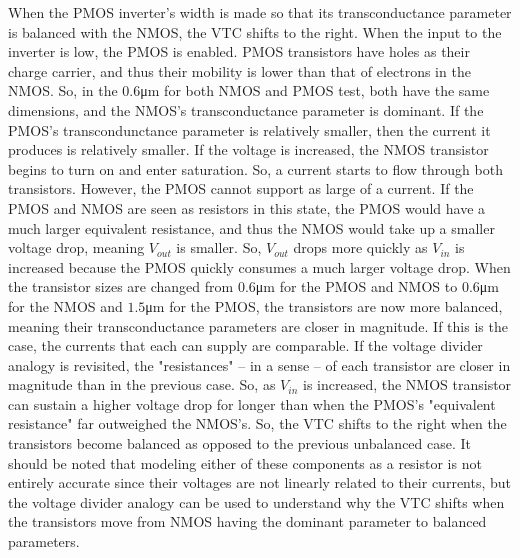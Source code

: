When the PMOS inverter's width is made so that its transconductance parameter is balanced with the NMOS, the VTC shifts to the right. When the input to the inverter is low, the PMOS is enabled. PMOS transistors have holes as their charge carrier, and thus their mobility is lower than that of electrons in the NMOS. So, in the $0.6$\si{\micro\meter} for both NMOS and PMOS test, both have the same dimensions, and the NMOS's transconductance parameter is dominant. If the PMOS's transcondunctance parameter is relatively smaller, then the current it produces is relatively smaller. If the voltage is increased, the NMOS transistor begins to turn on and enter saturation. So, a current starts to flow through both transistors. However, the PMOS cannot support as large of a current. If the PMOS and NMOS are seen as resistors in this state, the PMOS would have a much larger equivalent resistance, and thus the NMOS would take up a smaller voltage drop, meaning $V_{out}$ is smaller. So, $V_{out}$ drops more quickly as $V_{in}$ is increased because the PMOS quickly consumes a much larger voltage drop.
When the transistor sizes are changed from $0.6$\si{\micro\meter} for the PMOS and NMOS to $0.6$\si{\micro\meter} for the NMOS and $1.5$\si{\micro\meter} for the PMOS, the transistors are now more balanced, meaning their transconductance parameters are closer in magnitude. If this is the case, the currents that each can supply are comparable. If the voltage divider analogy is revisited, the "resistances" -- in a sense -- of each transistor are closer in magnitude than in the previous case. So, as $V_{in}$ is increased, the NMOS transistor can sustain a higher voltage drop for longer than when the PMOS's "equivalent resistance" far outweighed the NMOS's. So, the VTC shifts to the right when the transistors become balanced as opposed to the previous unbalanced case. It should be noted that modeling either of these components as a resistor is not entirely accurate since their voltages are not linearly related to their currents, but the voltage divider analogy can be used to understand why the VTC shifts when the transistors move from NMOS having the dominant parameter to balanced parameters.
